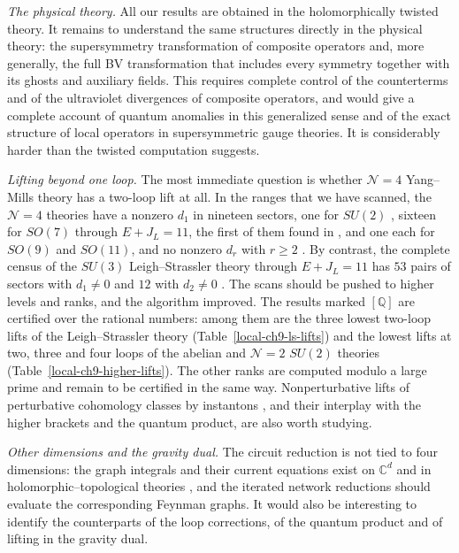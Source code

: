 \documentclass[11pt]{article}
\numberwithin{equation}{section}
\numberwithin{figure}{section}
\numberwithin{table}{section}
\begin{document}
\emph{The physical theory.} All our results are obtained in the holomorphically twisted theory. It remains to understand the same structures directly in the physical theory: the supersymmetry transformation of composite operators and, more generally, the full BV transformation that includes every symmetry together with its ghosts and auxiliary fields. This requires complete control of the counterterms and of the ultraviolet divergences of composite operators, and would give a complete account of quantum anomalies in this generalized sense and of the exact structure of local operators in supersymmetric gauge theories. It is considerably harder than the twisted computation suggests.

\emph{Lifting beyond one loop.} The most immediate question is whether $\mathcal N=4$ Yang--Mills theory has a two-loop lift at all. In the ranges that we have scanned, the $\mathcal N=4$ theories have a nonzero $d_1$ in nineteen sectors, one for $SU(2)$ \cite{KKLP}, sixteen for $SO(7)$ through $E+J_L=11$, the first of them found in \cite{KonishiBH}, and one each for $SO(9)$ and $SO(11)$, and no nonzero $d_r$ with $r\ge2$ \cite[supplement, Section S3.3]{Repo}. By contrast, the complete census of the $SU(3)$ Leigh--Strassler theory through $E+J_L=11$ has $53$ pairs of sectors with $d_1\ne0$ and $12$ with $d_2\ne0$ \cite[supplement, Section S6.2]{Repo}. The scans should be pushed to higher levels and ranks, and the algorithm improved. The results marked $[\mathbb Q]$ are certified over the rational numbers: among them are the three lowest two-loop lifts of the Leigh--Strassler theory (Table~\ref{local-ch9-ls-lifts}) and the lowest lifts at two, three and four loops of the abelian and $\mathcal N=2$ $SU(2)$ theories (Table~\ref{local-ch9-higher-lifts}). The other ranks are computed modulo a large prime and remain to be certified in the same way. Nonperturbative lifts of perturbative cohomology classes by instantons \cite{semichiral,BK}, and their interplay with the higher brackets and the quantum product, are also worth studying.

\emph{Other dimensions and the gravity dual.} The circuit reduction is not tied to four dimensions: the graph integrals and their current equations exist on $\mathbb C^d$ and in holomorphic--topological theories \cite{Wang,WW}, and the iterated network reductions should evaluate the corresponding Feynman graphs. It would also be interesting to identify the counterparts of the loop corrections, of the quantum product and of lifting in the gravity dual.
\end{document}

